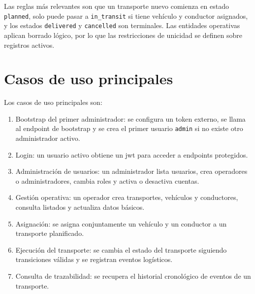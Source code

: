 Las reglas más relevantes son que un transporte nuevo comienza en estado \texttt{planned}, solo puede pasar a \texttt{in\_transit} si tiene vehículo y conductor asignados, y los estados \texttt{delivered} y \texttt{cancelled} son terminales. Las entidades operativas aplican borrado lógico, por lo que las restricciones de unicidad se definen sobre registros activos.

\section{Casos de uso principales}
\label{sec:casos-uso}

Los casos de uso principales son:

\begin{enumerate}
  \item Bootstrap del primer administrador: se configura un token externo, se llama al endpoint de bootstrap y se crea el primer usuario \texttt{admin} si no existe otro administrador activo.
  \item Login: un usuario activo obtiene un \acrshort{jwt} para acceder a endpoints protegidos.
  \item Administración de usuarios: un administrador lista usuarios, crea operadores o administradores, cambia roles y activa o desactiva cuentas.
  \item Gestión operativa: un operador crea transportes, vehículos y conductores, consulta listados y actualiza datos básicos.
  \item Asignación: se asigna conjuntamente un vehículo y un conductor a un transporte planificado.
  \item Ejecución del transporte: se cambia el estado del transporte siguiendo transiciones válidas y se registran eventos logísticos.
  \item Consulta de trazabilidad: se recupera el historial cronológico de eventos de un transporte.
\end{enumerate}
